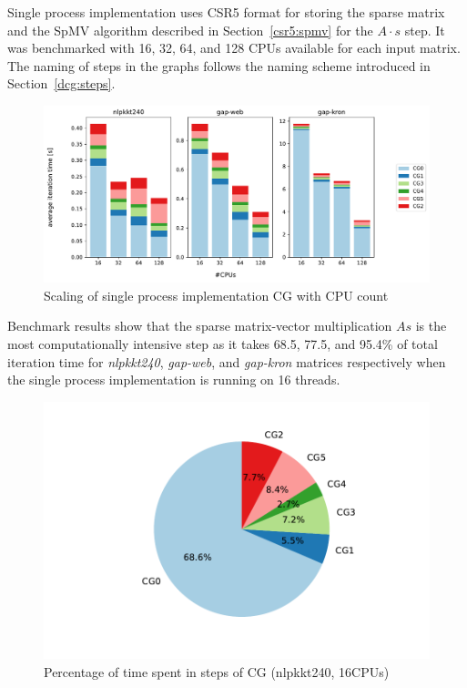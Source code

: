 \documentclass[thesis=M,english]{FITthesis}[2019/12/23]
\begin{document}
Single process implementation uses CSR5 format for storing the sparse matrix and the
SpMV algorithm  described in Section~\ref{csr5:spmv} for the \(A \cdot s\) step. It was benchmarked
with 16, 32, 64, and 128 CPUs available for each input matrix. The naming of steps
in the graphs follows the naming scheme introduced in Section~\ref{dcg:steps}.

\begin{figure}[htp]
    \centering
    \includegraphics[scale=0.5]{static/single_process.pdf}
    \caption{Scaling of single process implementation CG with CPU count}
\end{figure}

Benchmark results show that the sparse matrix-vector multiplication
\(As\) is the most computationally intensive step as it takes 68.5, 77.5, and 95.4\% of
total iteration time for \textit{nlpkkt240}, \textit{gap-web}, and \textit{gap-kron}
matrices respectively when the single process implementation is running on 16 threads.


\begin{figure}[htp]
    \centering
    \includegraphics[scale=0.6]{static/cg_sp_nlpkkt240_16.pdf}
    \caption{Percentage of time spent in steps of CG (nlpkkt240, 16CPUs)}
\end{figure}
\end{document}
